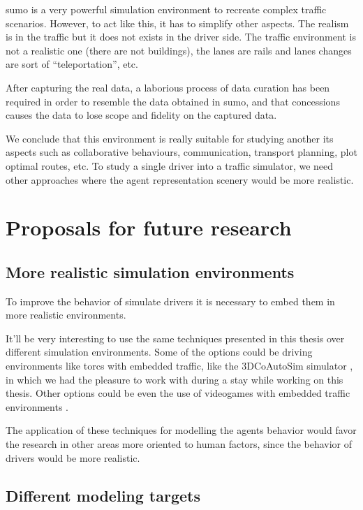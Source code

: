 \gls{sumo} is a very powerful simulation environment to recreate complex traffic scenarios. However, to act like this, it has to simplify other aspects. The realism is in the traffic but it does not exists in the driver side. The traffic environment is not a realistic one (there are not buildings), the lanes are rails and lanes changes are sort of \enquote{teleportation}, etc.

After capturing the real data, a laborious process of data curation has been required in order to resemble the data obtained in \gls{sumo}, and that concessions causes the data to lose scope and fidelity on the captured data.

We conclude that this environment is really suitable for studying another \acrshort{its} aspects such as collaborative behaviours, communication, transport planning, plot optimal routes, etc. To study a single driver into a traffic simulator, we need other approaches where the agent representation scenery would be more realistic.

\section{Proposals for future research}

\subsection{More realistic simulation environments}

To improve the behavior of simulate drivers it is necessary to embed them in more realistic environments.

It'll be very interesting to use the same techniques presented in this thesis over different simulation environments. Some of the options could be driving environments like \ac{torcs} with embedded traffic, like the 3DCoAutoSim simulator \cite{olaverri2018implementation}, in which we had the pleasure to work with during a stay while working on this thesis. Other options could be even the use of videogames with embedded traffic environments \cite{richter2016playing, johnson2017driving}.

The application of these techniques for modelling the agents behavior would favor the research in other areas more oriented to human factors, since the behavior of drivers would be more realistic.

\subsection{Different modeling targets}

